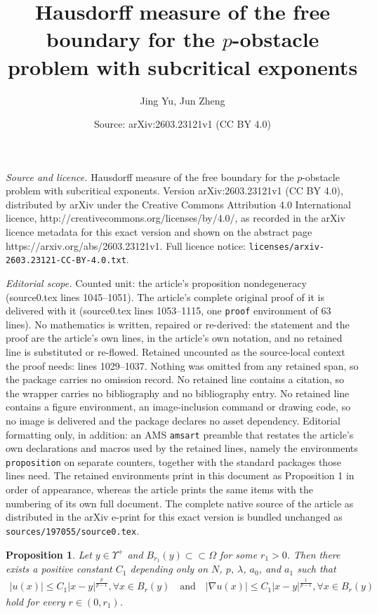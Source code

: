 \documentclass[10pt,a4paper]{amsart}
\title{Hausdorff measure of the free boundary for the $p$-obstacle problem with subcritical exponents}
\author{Jing Yu, Jun Zheng}
\date{Source: arXiv:2603.23121v1 (CC BY 4.0)}
\newtheorem{proposition}{Proposition}
\begin{document}
\maketitle

\noindent\emph{Source and licence.} Hausdorff measure of the free boundary for the $p$-obstacle problem with subcritical exponents. Version arXiv:2603.23121v1 (CC BY 4.0), distributed by arXiv under the Creative Commons Attribution 4.0 International licence, http://creativecommons.org/licenses/by/4.0/, as recorded in the arXiv licence metadata for this exact version and shown on the abstract page https://arxiv.org/abs/2603.23121v1. Full licence notice: \texttt{licenses/arxiv-2603.23121-CC-BY-4.0.txt}.\par\smallskip

\noindent\textit{Editorial scope.} Counted unit: the article's proposition nondegeneracy (source0.tex lines 1045--1051). The article's complete original proof of it is delivered with it (source0.tex lines 1053--1115, one \texttt{proof} environment of 63 lines). No mathematics is written, repaired or re-derived: the statement and the proof are the article's own lines, in the article's own notation, and no retained line is substituted or re-flowed.  Retained uncounted as the source-local context the proof needs: lines 1029--1037.  Nothing was omitted from any retained span, so the package carries no omission record.  No retained line contains a citation, so the wrapper carries no bibliography and no bibliography entry.  No retained line contains a figure environment, an image-inclusion command or drawing code, so no image is delivered and the package declares no asset dependency.  Editorial formatting only, in addition: an AMS \texttt{amsart} preamble that restates the article's own declarations and macros used by the retained lines, namely the environments \texttt{proposition} on separate counters, together with the standard packages those lines need.  The retained environments print in this document as Proposition 1 in order of appearance, whereas the article prints the same items with the numbering of its own full document.  The complete native source of the article as distributed in the arXiv e-print for this exact version is bundled unchanged as \texttt{sources/197055/source0.tex}.
	\begin{proposition}\label{grow}
		Let $y \in \Upsilon^+$ and $B_{r_1}(y) \subset \subset \Omega$  for some $r_1 > 0$. Then there exists a positive constant $C_1$ depending only on $N$, $p$, $\lambda$, $a_0$, and $a_1$ such that
		\begin{align*}
			|u(x)| \leq C_1 |x - y|^{\frac{p}{p-1}},\forall x \in B_r(y) \quad\text{and}\quad |\nabla u(x)| \leq C_1 |x - y|^{\frac{1}{p-1}},  { \forall x \in B_r(y) }
		\end{align*}
		hold  for every $r \in (0, r_1)$.
	\end{proposition}
\end{document}
